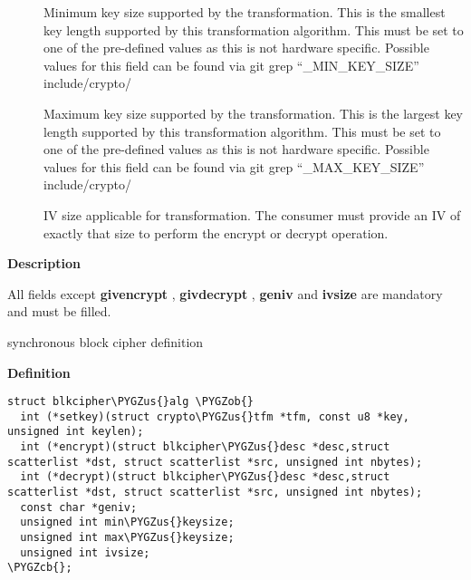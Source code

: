 \documentclass[a4paper,8pt,english]{sphinxmanual}
\def\PYGZus{\char`\_}
\def\PYGZob{\char`\{}
\def\PYGZcb{\char`\}}
\begin{document}
\begin{description}
\item[{}] \leavevmode
Minimum key size supported by the transformation. This is the
smallest key length supported by this transformation algorithm.
This must be set to one of the pre-defined values as this is
not hardware specific. Possible values for this field can be
found via git grep ``\_MIN\_KEY\_SIZE'' include/crypto/

\item[{}] \leavevmode
Maximum key size supported by the transformation. This is the
largest key length supported by this transformation algorithm.
This must be set to one of the pre-defined values as this is
not hardware specific. Possible values for this field can be
found via git grep ``\_MAX\_KEY\_SIZE'' include/crypto/

\item[{}] \leavevmode
IV size applicable for transformation. The consumer must provide an
IV of exactly that size to perform the encrypt or decrypt operation.

\end{description}

\textbf{Description}

All fields except \textbf{givencrypt} , \textbf{givdecrypt} , \textbf{geniv} and \textbf{ivsize} are
mandatory and must be filled.

\begin{fulllineitems}
\label{crypto/api-skcipher:c.blkcipher_alg}
synchronous block cipher definition

\end{fulllineitems}


\textbf{Definition}

\begin{Verbatim}[commandchars=\\\{\}]
struct blkcipher\PYGZus{}alg \PYGZob{}
  int (*setkey)(struct crypto\PYGZus{}tfm *tfm, const u8 *key, unsigned int keylen);
  int (*encrypt)(struct blkcipher\PYGZus{}desc *desc,struct scatterlist *dst, struct scatterlist *src, unsigned int nbytes);
  int (*decrypt)(struct blkcipher\PYGZus{}desc *desc,struct scatterlist *dst, struct scatterlist *src, unsigned int nbytes);
  const char *geniv;
  unsigned int min\PYGZus{}keysize;
  unsigned int max\PYGZus{}keysize;
  unsigned int ivsize;
\PYGZcb{};
\end{Verbatim}
\end{document}
